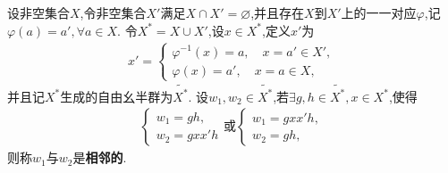 \documentclass[../../main.tex]{subfiles}%
\begin{document}
\begin{definition}
设非空集合$X$,令非空集合$X'$满足$X\cap X'=\varnothing$,并且存在$X$到$X'$上的一一对应$\varphi$,记$\varphi(a)=a',\forall a\in X.$
令$X^*=X\cup X'$,设$x\in X^*$,定义$x'$为
\begin{align}
x' = \begin{cases}
\varphi^{-1}(x)=a,\quad x=a'\in X', \\
\varphi(x)=a',\quad x=a\in X,
\end{cases}\label{eq::::--2r89hweio4sfklnaiomziw2q12344.8.1}
\end{align}
并且记$X^*$生成的自由幺半群为$\widetilde{X^*}$.
设$w_1,w_2\in \widetilde{X^*}$,若$\exists g,h\in \widetilde{X^*},x\in X^*$,使得
\begin{align*}
\begin{cases}
w_1=gh, \\
w_2=gxx'h
\end{cases}\text{或}\begin{cases}
w_1=gxx'h, \\
w_2=gh,
\end{cases}
\end{align*}
则称$w_1$与$w_2$是\textbf{相邻的}.
\end{definition}
\end{document}
